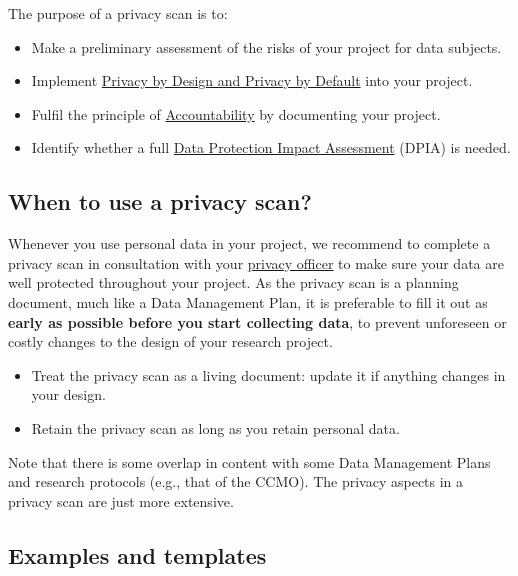 \documentclass[
]{book}
\providecommand{\tightlist}{%
  \setlength{\itemsep}{0pt}\setlength{\parskip}{0pt}}
\begin{document}
The purpose of a privacy scan is to:

\begin{itemize}
\tightlist
\item
  Make a preliminary assessment of the risks of your project for data subjects.\\
\item
  Implement \protect\hyperlink{privacy-by-design}{Privacy by Design and Privacy by Default} into
  your project.
\item
  Fulfil the principle of \protect\hyperlink{accountability}{Accountability} by documenting your
  project.
\item
  Identify whether a full \protect\hyperlink{dpia}{Data Protection Impact Assessment} (DPIA) is needed.
\end{itemize}

\hypertarget{privacy-scan-when}{%
\subsection{When to use a privacy scan?}\label{privacy-scan-when}}

Whenever you use personal data in your project, we recommend to complete a
privacy scan in consultation with your \protect\hyperlink{support}{privacy officer}
to make sure your data are well protected throughout your project. As the
privacy scan is a planning document, much like a Data Management Plan, it is
preferable to fill it out as \textbf{early as possible before you start collecting data},
to prevent unforeseen or costly changes to the design of your research project.

\begin{itemize}
\tightlist
\item
  Treat the privacy scan as a living document: update it if anything changes
  in your design.\\
\item
  Retain the privacy scan as long as you retain personal data.
\end{itemize}

Note that there is some overlap in content with some Data Management Plans and
research protocols (e.g., that of the CCMO). The privacy aspects in a privacy
scan are just more extensive.

\hypertarget{examples-and-templates-1}{%
\subsection{Examples and templates}\label{examples-and-templates-1}}
\end{document}
